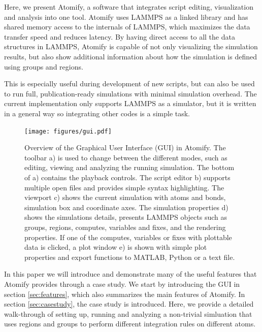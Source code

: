 \documentclass[12pt,a4paper,final]{iopart}
\begin{document}
Here, we present Atomify, a software that integrates script editing,
visualization and analysis into one tool.
Atomify uses LAMMPS as a linked library and has shared memory access to the internals of LAMMPS,
which maximizes the data transfer speed and reduces latency.
By having direct access to all the data structures in LAMMPS, Atomify is capable of not only visualizing the simulation results,
but also show additional information about how the simulation is defined using groups and regions.

This is especially useful during development of new scripts, but can also be used
to run full, publication-ready simulations with minimal simulation overhead.
The current implementation only supports LAMMPS as a simulator, but it is written in a general
way so integrating other codes is a simple task.

\begin{figure}
	\centering
	\texttt{[image: figures/gui.pdf]}
	\caption{%
	Overview of the Graphical User Interface (GUI) in Atomify.
	The toolbar a) is used to change between the different modes, such as
	editing, viewing and analyzing the running simulation.
	The bottom of a) contains the playback controls.
	The script editor b) supports multiple open files and provides simple syntax highlighting.
	The viewport c) shows the current simulation with atoms and bonds, simulation box and coordinate axes.
	The simulation properties d) shows the simulations details, presents
	LAMMPS objects such as groups, regions, computes, variables and fixes, and the rendering
	properties. If one of the computes, variables or fixes with plottable data is clicked, a plot window
	e) is shown with simple plot properties and export functions to MATLAB, Python or a text file.
	}
	\label{fig:gui}
\end{figure}

In this paper we will 
introduce and demonstrate many of the useful features that Atomify provides through a case study. 
We start by introducing the GUI in section \ref{sec:features}, which also summarizes the main features of Atomify.
In section \ref{sec:casestudy}, the case study is introduced. Here, we provide a detailed walk-through of setting up, running and analyzing a non-trivial simluation that uses regions and groups to perform different integration rules on different atoms.
\end{document}
